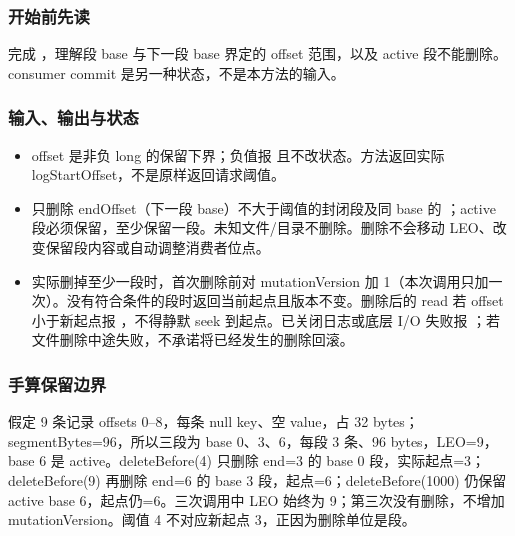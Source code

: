 \subsubsection*{开始前先读}
完成 ，理解段 base 与下一段 base 界定的 offset 范围，以及 active 段不能删除。consumer commit 是另一种状态，不是本方法的输入。
\subsubsection*{输入、输出与状态}
\begin{itemize}
\item offset 是非负 long 的保留下界；负值报  且不改状态。方法返回实际 logStartOffset，不是原样返回请求阈值。
\item 只删除 endOffset（下一段 base）不大于阈值的封闭段及同 base 的 ；active 段必须保留，至少保留一段。未知文件/目录不删除。删除不会移动 LEO、改变保留段内容或自动调整消费者位点。
\item 实际删掉至少一段时，首次删除前对 mutationVersion 加 1（本次调用只加一次）。没有符合条件的段时返回当前起点且版本不变。删除后的 read 若 offset 小于新起点报 ，不得静默 seek 到起点。已关闭日志或底层 I/O 失败报 ；若文件删除中途失败，不承诺将已经发生的删除回滚。
\end{itemize}
\subsubsection*{手算保留边界}
假定 9 条记录 offsets 0–8，每条 null key、空 value，占 32 bytes；segmentBytes=96，所以三段为 base 0、3、6，每段 3 条、96 bytes，LEO=9，base 6 是 active。deleteBefore(4) 只删除 end=3 的 base 0 段，实际起点=3；deleteBefore(9) 再删除 end=6 的 base 3 段，起点=6；deleteBefore(1000) 仍保留 active base 6，起点仍=6。三次调用中 LEO 始终为 9；第三次没有删除，不增加 mutationVersion。阈值 4 不对应新起点 3，正因为删除单位是段。
